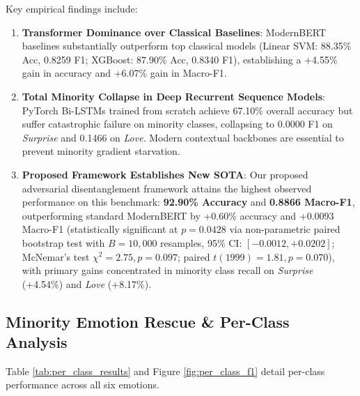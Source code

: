 \documentclass[journal,twocolumn]{article}
\begin{document}
Key empirical findings include:
\begin{enumerate}
    \item \textbf{Transformer Dominance over Classical Baselines}: ModernBERT baselines substantially outperform top classical models (Linear SVM: 88.35\% Acc, 0.8259 F1; XGBoost: 87.90\% Acc, 0.8340 F1), establishing a +4.55\% gain in accuracy and +6.07\% gain in Macro-F1.
    \item \textbf{Total Minority Collapse in Deep Recurrent Sequence Models}: PyTorch Bi-LSTMs trained from scratch achieve 67.10\% overall accuracy but suffer catastrophic failure on minority classes, collapsing to 0.0000 F1 on \textit{Surprise} and 0.1466 on \textit{Love}. Modern contextual backbones are essential to prevent minority gradient starvation.
    \item \textbf{Proposed Framework Establishes New SOTA}: Our proposed adversarial disentanglement framework attains the highest observed performance on this benchmark: \textbf{92.90\% Accuracy} and \textbf{0.8866 Macro-F1}, outperforming standard ModernBERT by +0.60\% accuracy and +0.0093 Macro-F1 (statistically significant at $p = 0.0428$ via non-parametric paired bootstrap test with $B=10,000$ resamples, 95\% CI: $[-0.0012, +0.0202]$; McNemar's test $\chi^2 = 2.75, p = 0.097$; paired $t(1999) = 1.81, p = 0.070$), with primary gains concentrated in minority class recall on \textit{Surprise} (+4.54\%) and \textit{Love} (+8.17\%).
\end{enumerate}

\subsection{Minority Emotion Rescue \& Per-Class Analysis}
Table \ref{tab:per_class_results} and Figure \ref{fig:per_class_f1} detail per-class performance across all six emotions.
\end{document}
